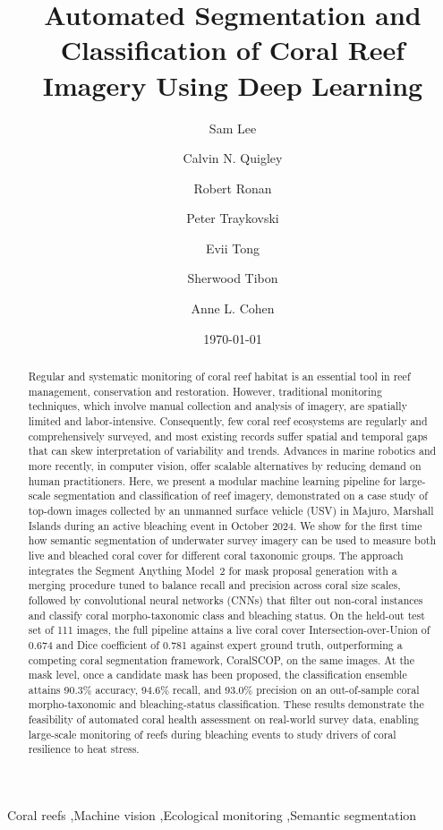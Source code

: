 \documentclass[11pt]{elsarticle}
\date{\today}
\begin{document}
\begin{frontmatter}

\title{Automated Segmentation and Classification of Coral Reef Imagery Using Deep Learning}

\author[1,2]{Sam Lee}
\author[2]{Calvin N. Quigley}
\author[2]{Robert Ronan}
\author[2]{Peter Traykovski}
\author[2]{Evii Tong}
\author{Sherwood Tibon}
\author[2]{Anne L. Cohen}


\begin{abstract}
Regular and systematic monitoring of coral reef habitat is an essential tool in reef management, conservation and restoration. However, traditional monitoring techniques, which involve manual collection and analysis of imagery, are spatially limited and labor-intensive. Consequently, few coral reef ecosystems are regularly and comprehensively surveyed, and most existing records suffer spatial and temporal gaps that can skew interpretation of variability and trends. Advances in marine robotics and more recently, in computer vision, offer scalable alternatives by reducing demand on human practitioners. Here, we present a modular machine learning pipeline for large-scale segmentation and classification of reef imagery, demonstrated on a case study of top-down images collected by an unmanned surface vehicle (USV) in Majuro, Marshall Islands during an active bleaching event in October 2024. We show for the first time how semantic segmentation of underwater survey imagery can be used to measure both live and bleached coral cover for different coral taxonomic groups. The approach integrates the Segment Anything Model~2 for mask proposal generation with a merging procedure tuned to balance recall and precision across coral size scales, followed by convolutional neural networks (CNNs) that filter out non-coral instances and classify coral morpho-taxonomic class and bleaching status. On the held-out test set of 111 images, the full pipeline attains a live coral cover Intersection-over-Union of 0.674 and Dice coefficient of 0.781 against expert ground truth, outperforming a competing coral segmentation framework, CoralSCOP, on the same images. At the mask level, once a candidate mask has been proposed, the classification ensemble attains 90.3\% accuracy, 94.6\% recall, and 93.0\% precision on an out-of-sample coral morpho-taxonomic and bleaching-status classification. These results demonstrate the feasibility of automated coral health assessment on real-world survey data, enabling large-scale monitoring of reefs during bleaching events to study drivers of coral resilience to heat stress.
\end{abstract}


\begin{keyword}
Coral reefs \sep Machine vision \sep Ecological monitoring \sep Semantic segmentation
\end{keyword}

\end{frontmatter}
\end{document}
